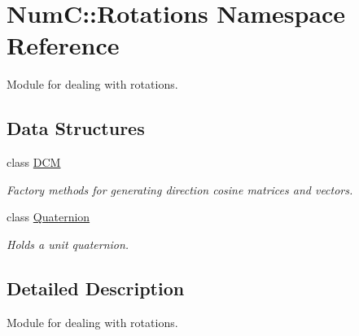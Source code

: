 \hypertarget{namespace_num_c_1_1_rotations}{}\section{NumC\+:\+:Rotations Namespace Reference}
\label{namespace_num_c_1_1_rotations}


Module for dealing with rotations.  


\subsection*{Data Structures}
\begin{DoxyCompactItemize}
\item 
class \mbox{\hyperlink{class_num_c_1_1_rotations_1_1_d_c_m}{D\+CM}}
\begin{DoxyCompactList}\small\item\em Factory methods for generating direction cosine matrices and vectors. \end{DoxyCompactList}\item 
class \mbox{\hyperlink{class_num_c_1_1_rotations_1_1_quaternion}{Quaternion}}
\begin{DoxyCompactList}\small\item\em Holds a unit quaternion. \end{DoxyCompactList}\end{DoxyCompactItemize}


\subsection{Detailed Description}
Module for dealing with rotations. 